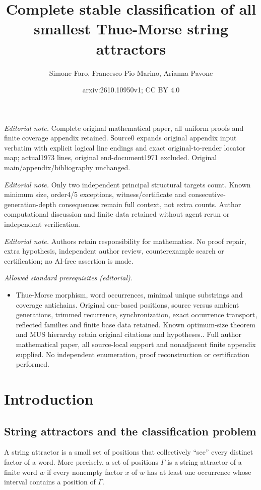 \documentclass[10pt,a4paper]{article}
\title{Complete stable classification of all smallest Thue-Morse string attractors}
\author{Simone Faro, Francesco Pio Marino, Arianna Pavone}
\date{arxiv:2610.10950v1; CC BY 4.0}
\theoremstyle{definition}\newtheorem{definition}[theorem]{Definition}
\theoremstyle{remark}\newtheorem{remark}[theorem]{Remark}
\begin{document}
\maketitle
\noindent\textit{Editorial note.} Complete original mathematical paper, all uniform proofs and finite coverage appendix retained. Source0 expands original appendix input verbatim with explicit logical line endings and exact original-to-render locator map; actual1973 lines, original end-document1971 excluded. Original main/appendix/bibliography unchanged.\par\medskip
\noindent\textit{Editorial note.} Only two independent principal structural targets count. Known minimum size, order4/5 exceptions, witness/certificate and consecutive-generation-depth consequences remain full context, not extra counts. Author computational discussion and finite data retained without agent rerun or independent verification.\par\medskip
\noindent\textit{Editorial note.} Authors retain responsibility for mathematics. No proof repair, extra hypothesis, independent author review, counterexample search or certification; no AI-free assertion is made.\par\medskip
\noindent\textit{Allowed standard prerequisites (editorial).}\begin{itemize}
\item Thue-Morse morphism, word occurrences, minimal unique substrings and coverage antichains. Original one-based positions, source versus ambient generations, trimmed recurrence, synchronization, exact occurrence transport, reflected families and finite base data retained. Known optimum-size theorem and MUS hierarchy retain original citations and hypotheses.. Full author mathematical paper, all source-local support and nonadjacent finite appendix supplied. No independent enumeration, proof reconstruction or certification performed.
\end{itemize}\medskip
\section{Introduction}

\subsection{String attractors and the classification problem}
A string attractor is a small set of positions that collectively ``see'' every distinct factor of a word. More precisely, a set of positions $\Gamma$ is a string attractor of a finite word $w$ if every nonempty factor $x$ of $w$ has at least one occurrence whose interval contains a position of $\Gamma$.
\end{document}
